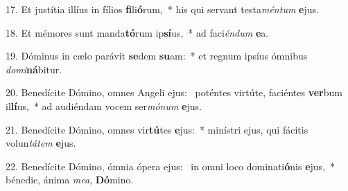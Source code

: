 17. Et justítia illíus in fílios \textbf{fi}li\textbf{ó}rum,~*  his qui servant testa\textit{mén}\textit{tum} \textbf{e}jus.\

18. Et mémores sunt manda\textbf{tó}rum ip\textbf{sí}us,~*  ad faci\textit{én}\textit{dum} \textbf{e}a.\

19. Dóminus in cælo parávit \textbf{se}dem \textbf{su}am:~*  et regnum ipsíus ómnibus \textit{do}\textit{mi}\textbf{ná}bitur.\

20. Benedícite Dómino, omnes Angeli ejus: \dag\  poténtes virtúte, faciéntes \textbf{ver}bum il\textbf{lí}us,~*  ad audiéndam vocem ser\textit{mó}\textit{num} \textbf{e}jus.\

21. Benedícite Dómino, omnes vir\textbf{tú}tes \textbf{e}jus:~*  minístri ejus, qui fácitis volun\textit{tá}\textit{tem} \textbf{e}jus.\

22. Benedícite Dómino, ómnia ópera ejus: \dag\  in omni loco dominati\textbf{ó}nis \textbf{e}jus,~*  bénedic, ánima \textit{me}\textit{a}, \textbf{Dó}mino.\

